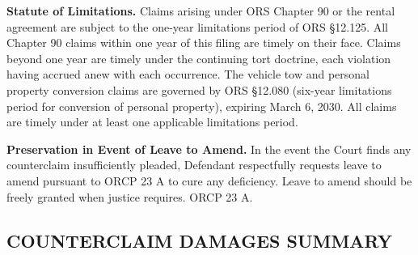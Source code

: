\documentclass[12pt,letterpaper]{article}
\begin{document}
\textbf{Statute of Limitations.} Claims arising under ORS Chapter 90 or the rental agreement are subject to the one-year limitations period of ORS \S12.125. All Chapter 90 claims within one year of this filing are timely on their face. Claims beyond one year are timely under the continuing tort doctrine, each violation having accrued anew with each occurrence. The vehicle tow and personal property conversion claims are governed by ORS \S12.080 (six-year limitations period for conversion of personal property), expiring March 6, 2030. All claims are timely under at least one applicable limitations period.

\textbf{Preservation in Event of Leave to Amend.} In the event the Court finds any counterclaim insufficiently pleaded, Defendant respectfully requests leave to amend pursuant to ORCP 23 A to cure any deficiency. Leave to amend should be freely granted when justice requires. ORCP 23 A.

\subsection*{COUNTERCLAIM DAMAGES SUMMARY}
\end{document}
